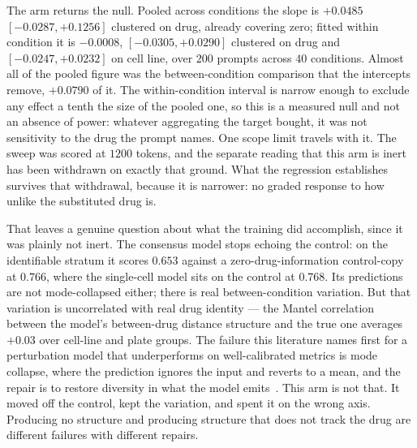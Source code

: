 The arm returns the null. Pooled across conditions the slope is $+0.0485$
$[-0.0287, +0.1256]$ clustered on drug, already covering zero; fitted within
condition it is $-0.0008$, $[-0.0305, +0.0290]$ clustered on drug and
$[-0.0247, +0.0232]$ on cell line, over $200$ prompts across $40$ conditions.
Almost all of the pooled figure was the between-condition comparison that the
intercepts remove, $+0.0790$ of it. The within-condition interval is narrow enough
to exclude any effect a tenth the size of the pooled one, so this is a measured
null and not an absence of power: whatever aggregating the target bought, it was
not sensitivity to the drug the prompt names. One scope limit travels with it.
The sweep was scored at $1200$ tokens, and the separate reading that this arm is
inert has been withdrawn on exactly that ground.
What the regression establishes survives that withdrawal, because it is narrower:
no graded response to how unlike the substituted drug is.

That leaves a genuine question about what the training did accomplish, since it
was plainly not inert. The consensus model stops echoing the control: on the
identifiable stratum it scores $0.653$ against a zero-drug-information
control-copy at $0.766$, where the single-cell model sits on the control at
$0.768$. Its predictions are not mode-collapsed either; there is real
between-condition variation. But that variation is uncorrelated with real drug
identity --- the Mantel correlation between the model's between-drug distance
structure and the true one averages $+0.03$ over cell-line and plate groups. The
failure this literature names first for a perturbation model that underperforms
on well-calibrated metrics is mode collapse, where the prediction ignores the
input and reverts to a mean, and the repair is to restore diversity in what the
model emits~\cite{mejia}. This arm is not that. It moved off the control, kept
the variation, and spent it on the wrong axis. Producing no structure and
producing structure that does not track the drug are different failures with
different repairs.